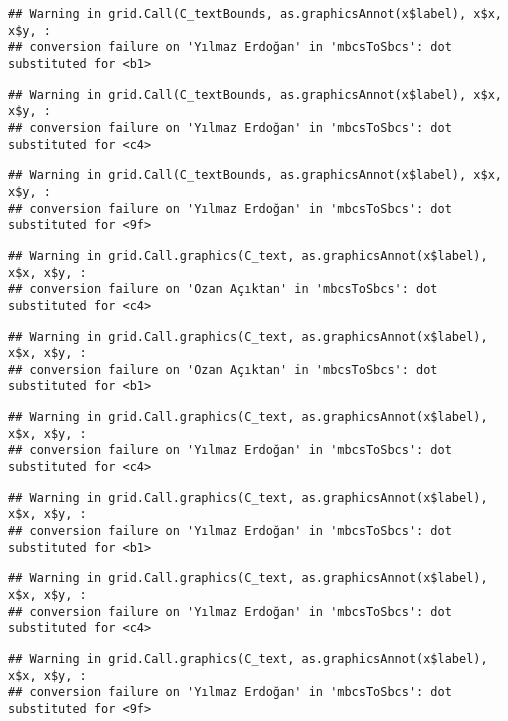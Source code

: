 \documentclass[
]{article}
\begin{document}
\begin{verbatim}
## Warning in grid.Call(C_textBounds, as.graphicsAnnot(x$label), x$x, x$y, :
## conversion failure on 'Yılmaz Erdoğan' in 'mbcsToSbcs': dot substituted for <b1>
\end{verbatim}

\begin{verbatim}
## Warning in grid.Call(C_textBounds, as.graphicsAnnot(x$label), x$x, x$y, :
## conversion failure on 'Yılmaz Erdoğan' in 'mbcsToSbcs': dot substituted for <c4>
\end{verbatim}

\begin{verbatim}
## Warning in grid.Call(C_textBounds, as.graphicsAnnot(x$label), x$x, x$y, :
## conversion failure on 'Yılmaz Erdoğan' in 'mbcsToSbcs': dot substituted for <9f>
\end{verbatim}

\begin{verbatim}
## Warning in grid.Call.graphics(C_text, as.graphicsAnnot(x$label), x$x, x$y, :
## conversion failure on 'Ozan Açıktan' in 'mbcsToSbcs': dot substituted for <c4>
\end{verbatim}

\begin{verbatim}
## Warning in grid.Call.graphics(C_text, as.graphicsAnnot(x$label), x$x, x$y, :
## conversion failure on 'Ozan Açıktan' in 'mbcsToSbcs': dot substituted for <b1>
\end{verbatim}

\begin{verbatim}
## Warning in grid.Call.graphics(C_text, as.graphicsAnnot(x$label), x$x, x$y, :
## conversion failure on 'Yılmaz Erdoğan' in 'mbcsToSbcs': dot substituted for <c4>
\end{verbatim}

\begin{verbatim}
## Warning in grid.Call.graphics(C_text, as.graphicsAnnot(x$label), x$x, x$y, :
## conversion failure on 'Yılmaz Erdoğan' in 'mbcsToSbcs': dot substituted for <b1>
\end{verbatim}

\begin{verbatim}
## Warning in grid.Call.graphics(C_text, as.graphicsAnnot(x$label), x$x, x$y, :
## conversion failure on 'Yılmaz Erdoğan' in 'mbcsToSbcs': dot substituted for <c4>
\end{verbatim}

\begin{verbatim}
## Warning in grid.Call.graphics(C_text, as.graphicsAnnot(x$label), x$x, x$y, :
## conversion failure on 'Yılmaz Erdoğan' in 'mbcsToSbcs': dot substituted for <9f>
\end{verbatim}
\end{document}
